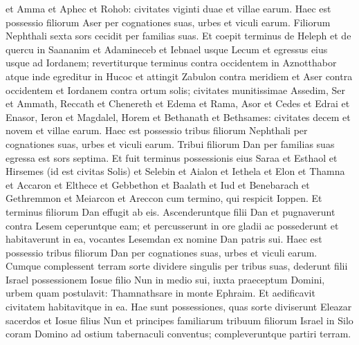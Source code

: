\begin{biblechapter}
\verse et Amma et Aphec et Rohob: civitates viginti duae et villae earum. 
\verse Haec est possessio filiorum Aser per cognationes suas, urbes et viculi earum. 
\verse Filiorum Nephthali sexta sors cecidit per familias suas. 
\verse Et coepit terminus de Heleph et de quercu in Saananim et Adamineceb et Iebnael usque Lecum et egressus eius usque ad Iordanem; 
\verse revertiturque terminus contra occidentem in Aznotthabor atque inde egreditur in Hucoc et attingit Zabulon contra meridiem et Aser contra occidentem et Iordanem contra ortum solis; 
\verse civitates munitissimae Assedim, Ser et Ammath, Reccath et Chenereth 
\verse et Edema et Rama, Asor 
\verse et Cedes et Edrai et Enasor, 
\verse Ieron et Magdalel, Horem et Bethanath et Bethsames: civitates decem et novem et villae earum. 
\verse Haec est possessio tribus filiorum Nephthali per cognationes suas, urbes et viculi earum. 
\verse Tribui filiorum Dan per familias suas egressa est sors septima. 
\verse Et fuit terminus possessionis eius Saraa et Esthaol et Hirsemes (id est civitas Solis) 
\verse et Selebin et Aialon et Iethela 
\verse et Elon et Thamna et Accaron  
\verse et Elthece et Gebbethon et Baalath 
\verse et Iud et Benebarach et Gethremmon  
\verse et Meiarcon et Areccon cum termino, qui respicit Ioppen. 
\verse Et terminus filiorum Dan effugit ab eis. Ascenderuntque filii Dan et pugnaverunt contra Lesem ceperuntque eam; et percusserunt in ore gladii ac possederunt et habitaverunt in ea, vocantes Lesemdan ex nomine Dan patris sui. 
\verse Haec est possessio tribus filiorum Dan per cognationes suas, urbes et viculi earum. 
\verse Cumque complessent terram sorte dividere singulis per tribus suas, dederunt filii Israel possessionem Iosue filio Nun in medio sui, 
\verse iuxta praeceptum Domini, urbem quam postulavit: Thamnathsare in monte Ephraim. Et aedificavit civitatem habitavitque in ea. 
\verse Hae sunt possessiones, quas sorte diviserunt Eleazar sacerdos et Iosue filius Nun et principes familiarum tribuum filiorum Israel in Silo coram Domino ad ostium tabernaculi conventus; compleveruntque partiri terram. 
\end{biblechapter}

